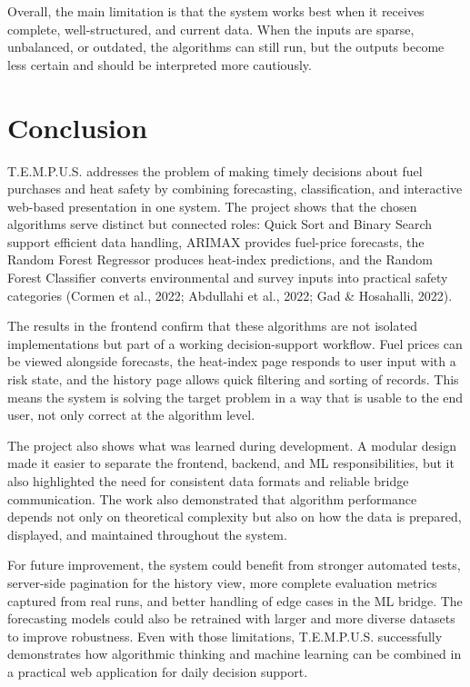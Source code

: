 \documentclass[12pt]{article}
\begin{document}
Overall, the main limitation is that the system works best when it receives complete, well-structured, and current data. When the inputs are sparse, unbalanced, or outdated, the algorithms can still run, but the outputs become less certain and should be interpreted more cautiously.

\newpage
\section{Conclusion}

T.E.M.P.U.S. addresses the problem of making timely decisions about fuel purchases and heat safety by combining forecasting, classification, and interactive web-based presentation in one system. The project shows that the chosen algorithms serve distinct but connected roles: Quick Sort and Binary Search support efficient data handling, ARIMAX provides fuel-price forecasts, the Random Forest Regressor produces heat-index predictions, and the Random Forest Classifier converts environmental and survey inputs into practical safety categories (Cormen et al., 2022; Abdullahi et al., 2022; Gad \& Hosahalli, 2022).

The results in the frontend confirm that these algorithms are not isolated implementations but part of a working decision-support workflow. Fuel prices can be viewed alongside forecasts, the heat-index page responds to user input with a risk state, and the history page allows quick filtering and sorting of records. This means the system is solving the target problem in a way that is usable to the end user, not only correct at the algorithm level.

The project also shows what was learned during development. A modular design made it easier to separate the frontend, backend, and ML responsibilities, but it also highlighted the need for consistent data formats and reliable bridge communication. The work also demonstrated that algorithm performance depends not only on theoretical complexity but also on how the data is prepared, displayed, and maintained throughout the system.

For future improvement, the system could benefit from stronger automated tests, server-side pagination for the history view, more complete evaluation metrics captured from real runs, and better handling of edge cases in the ML bridge. The forecasting models could also be retrained with larger and more diverse datasets to improve robustness. Even with those limitations, T.E.M.P.U.S. successfully demonstrates how algorithmic thinking and machine learning can be combined in a practical web application for daily decision support.
\end{document}
